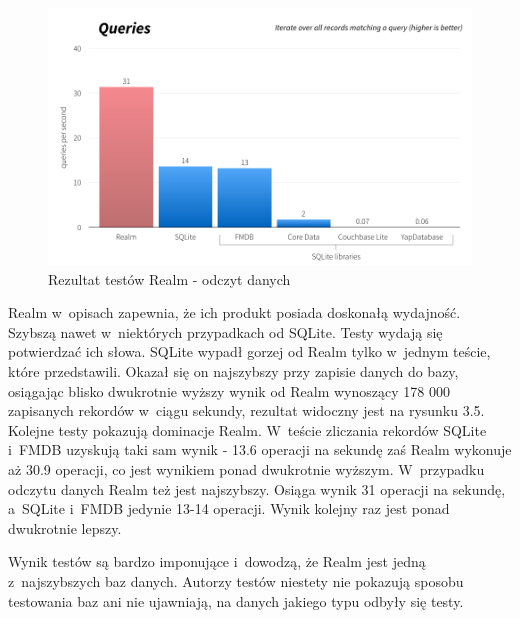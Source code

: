 \begin{figure}
\centering
	\includegraphics[width=\linewidth]{img/realm_query_test.png}
	\caption{Rezultat testów Realm - odczyt danych}
	\label{fig: realm_query_test}
\end{figure}
\clearpage

Realm w~opisach zapewnia, że ich produkt posiada doskonałą wydajność. Szybszą nawet w~niektórych przypadkach od SQLite. Testy wydają się potwierdzać ich słowa. SQLite wypadł gorzej od Realm tylko w~jednym teście, które przedstawili. Okazał się on najszybszy przy zapisie danych do bazy, osiągając blisko dwukrotnie wyższy wynik od Realm wynoszący 178 000 zapisanych rekordów w~ciągu sekundy, rezultat widoczny jest na rysunku 3.5. Kolejne testy pokazują dominacje Realm. W~teście zliczania rekordów SQLite i~FMDB uzyskują taki sam wynik - 13.6 operacji na sekundę zaś Realm wykonuje aż 30.9 operacji, co jest wynikiem ponad dwukrotnie wyższym. W~przypadku odczytu danych Realm też jest najszybszy. Osiąga wynik 31 operacji na sekundę, a~SQLite i~FMDB jedynie 13-14 operacji. Wynik kolejny raz jest ponad dwukrotnie lepszy. \par 
Wynik testów są bardzo imponujące i~dowodzą, że Realm jest jedną z~najszybszych baz danych. Autorzy testów niestety nie pokazują sposobu testowania baz ani nie ujawniają, na danych jakiego typu odbyły się testy.